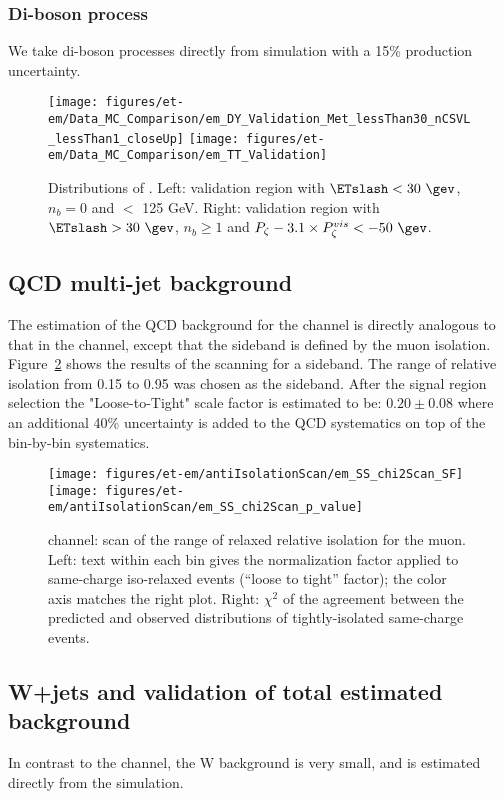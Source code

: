 \subsubsection{Di-boson process}
We take di-boson processes directly from simulation with a 15\% production uncertainty.


\begin{figure}\centering
  \texttt{[image: figures/et-em/Data\_MC\_Comparison/em\_DY\_Validation\_Met\_lessThan30\_nCSVL\_lessThan1\_closeUp]}
  \texttt{[image: figures/et-em/Data\_MC\_Comparison/em\_TT\_Validation]}
  \caption{\label{fig:em_dy_tt} Distributions of \meffemu. Left:
    validation region with $\ETslash<30~\gev$, $n_b = 0$ and \meffemu $<$ 125 GeV.  Right:
    validation region with $\ETslash>30~\gev$, $n_b\geq1$ and $P_{\zeta}- 3.1 \times P_{\zeta}^{vis} < -50~\gev$.}
\end{figure}




\subsection{QCD multi-jet background}\label{sec:em_qcd}
The estimation of the QCD background for the \tetm channel is directly
analogous to that in the \teth channel, except that the sideband is
defined by the muon isolation.  Figure~\ref{fig:em_scans} shows the
results of the scanning for a sideband.  The range of relative
isolation from 0.15 to 0.95 was chosen as the sideband. After the signal 
region selection the "Loose-to-Tight" scale factor is estimated
to be: $0.20 \pm 0.08$ where an additional 40\% uncertainty is added to the QCD systematics 
on top of the bin-by-bin systematics.

\begin{figure}\centering
  \texttt{[image: figures/et-em/antiIsolationScan/em\_SS\_chi2Scan\_SF]}
  \texttt{[image: figures/et-em/antiIsolationScan/em\_SS\_chi2Scan\_p\_value]}
  \caption{\label{fig:em_scans} \tetm channel: scan of the range of
    relaxed relative isolation for the muon.  Left: text within each
    bin gives the normalization factor applied to same-charge
    iso-relaxed events (``loose to tight'' factor); the color axis
    matches the right plot.  Right: $\chi^2$ of the agreement between
    the predicted and observed distributions of tightly-isolated
    same-charge events.}
\end{figure}


\subsection{W+jets and validation of total estimated background}
\label{sec:em_w_bkg_validation}
In contrast to the \teth channel, the W background is very small, and
is estimated directly from the simulation.

